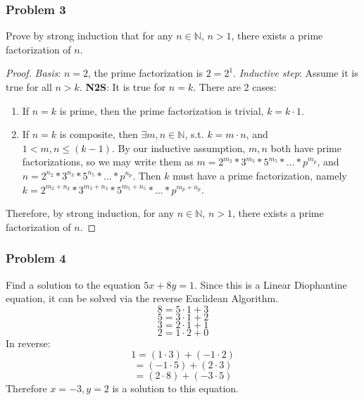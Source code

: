 \documentclass[hidelinks,12pt]{article}
\newcommand{\N}{\mathbb{N}}
\begin{document}
\subsubsection{Problem 3}
Prove by strong induction that for any $n\in\N$, $n>1$, there exists a prime factorization of $n$.
\begin{proof}
\emph{Basis}: $n=2$, the prime factorization is $2=2^1$.
\newline \emph{Inductive step}: Assume it is true for all $n>k$. \newline \textbf{N2S}: It is true for $n=k$. There are 2 cases:\begin{enumerate}
    \item If $n=k$ is prime, then the prime factorization is trivial, $k=k\cdot1$.
    \item If $n=k$ is composite, then $\exists m,n\in\N$, s.t. $k=m\cdot n$, and $1<m,n\leq (k-1)$. By our inductive assumption, $m,n$ both have prime factorizations, so we may write them as $m=2^{m_2}*3^{m_3}*5^{m_5}*...*p^{m_p}$, and $n=2^{n_2}*3^{n_3}*5^{n_5}*...*p^{n_p}$. Then $k$ must have a prime factorization, namely $k=2^{m_2+n_2}*3^{m_3+n_3}*5^{m_5+n_5}*...*p^{m_p+n_p}$.
\end{enumerate}
Therefore, by strong induction, for any $n\in\N$, $n>1$, there exists a prime factorization of $n$.
\end{proof}
\subsubsection{Problem 4}
Find a solution to the equation $5x+8y=1$.
\newline Since this is a Linear Diophantine equation, it can be solved via the reverse Euclidean Algorithm.
$$8=5\cdot1+3$$ $$5=3\cdot1+2$$ $$3=2\cdot1+1$$ $$2=1\cdot2+0$$ In reverse: $$1=(1\cdot3)+(-1\cdot2)$$ $$=(-1\cdot5)+(2\cdot3)$$ $$=(2\cdot8)+(-3\cdot5)$$ Therefore $x=-3,y=2$ is a solution to this equation.
\end{document}
